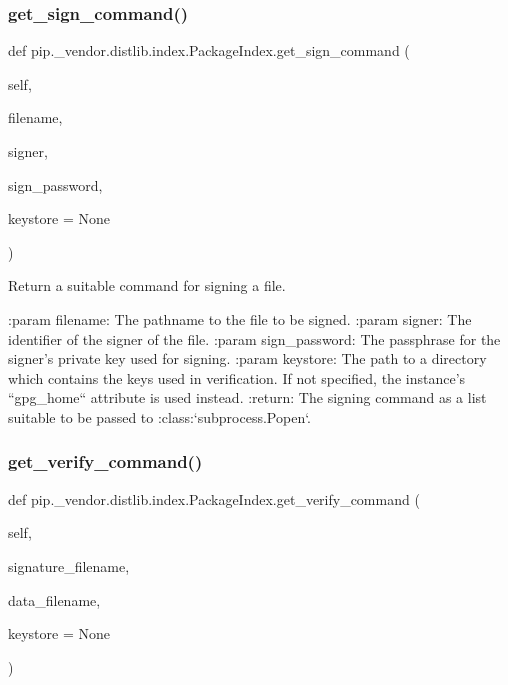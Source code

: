 \subsubsection{\texorpdfstring{get\+\_\+sign\+\_\+command()}{get\_sign\_command()}}
{\footnotesize\ttfamily def pip.\+\_\+vendor.\+distlib.\+index.\+Package\+Index.\+get\+\_\+sign\+\_\+command (\begin{DoxyParamCaption}\item[{}]{self,  }\item[{}]{filename,  }\item[{}]{signer,  }\item[{}]{sign\+\_\+password,  }\item[{}]{keystore = {\ttfamily None} }\end{DoxyParamCaption})}

\begin{DoxyVerb}Return a suitable command for signing a file.

:param filename: The pathname to the file to be signed.
:param signer: The identifier of the signer of the file.
:param sign_password: The passphrase for the signer's
              private key used for signing.
:param keystore: The path to a directory which contains the keys
         used in verification. If not specified, the
         instance's ``gpg_home`` attribute is used instead.
:return: The signing command as a list suitable to be
 passed to :class:`subprocess.Popen`.
\end{DoxyVerb}
 \mbox{\label{classpip_1_1__vendor_1_1distlib_1_1index_1_1PackageIndex_a6b7600d86dad5f090c2193ec5a6e4044}} 
\subsubsection{\texorpdfstring{get\+\_\+verify\+\_\+command()}{get\_verify\_command()}}
{\footnotesize\ttfamily def pip.\+\_\+vendor.\+distlib.\+index.\+Package\+Index.\+get\+\_\+verify\+\_\+command (\begin{DoxyParamCaption}\item[{}]{self,  }\item[{}]{signature\+\_\+filename,  }\item[{}]{data\+\_\+filename,  }\item[{}]{keystore = {\ttfamily None} }\end{DoxyParamCaption})}

